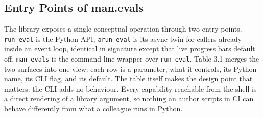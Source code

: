 \subsection{Entry Points of man.evals}
The library exposes a single conceptual operation through two entry points. \texttt{run\_eval} is the Python API; \texttt{arun\_eval} is its async twin for callers already inside an event loop, identical in signature except that live progress bars default off. \texttt{man-evals} is the command-line wrapper over \texttt{run\_eval}. Table 3.1 merges the two surfaces into one view: each row is a parameter, what it controls, its Python name, its CLI flag, and its default. The table itself makes the design point that matters: the CLI adds no behaviour. Every capability reachable from the shell is a direct rendering of a library argument, so nothing an author scripts in CI can behave differently from what a colleague runs in Python.